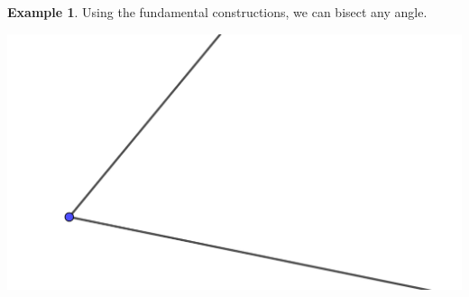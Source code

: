 \documentclass[11pt]{article}
\theoremstyle{definition}
\newtheorem{example}[theorem]{Example}
\begin{document}
\begin{example}
  Using the fundamental constructions, we can bisect any angle. 
  \begin{center}
    \includegraphics[scale=.75]{Images/bisect_angle_1.png}
  \end{center}


\end{example}
\end{document}
